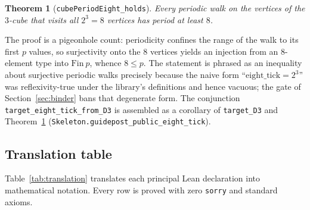 \documentclass[11pt]{article}
\newtheorem{theorem}{Theorem}[section]
\theoremstyle{definition}
\newcommand{\lean}[1]{\texttt{#1}}
\begin{document}
\begin{theorem}[\lean{cubePeriodEight\_holds}]
\label{thm:cube}
Every periodic walk on the vertices of the $3$-cube that visits all $2^3 = 8$ vertices has period at least $8$.
\end{theorem}

The proof is a pigeonhole count: periodicity confines the range of the walk to its first $p$ values, so surjectivity onto the $8$ vertices yields an injection from an $8$-element type into $\mathrm{Fin}\ p$, whence $8 \leq p$. The statement is phrased as an inequality about surjective periodic walks precisely because the naive form ``$\mathrm{eight\_tick} = 2^3$'' was reflexivity-true under the library's definitions and hence vacuous; the gate of Section~\ref{sec:binder} bans that degenerate form. The conjunction \lean{target\_eight\_tick\_from\_D3} is assembled as a corollary of \lean{target\_D3} and Theorem~\ref{thm:cube} (\lean{Skeleton.guidepost\_public\_eight\_tick}).

\subsection{Translation table}

Table~\ref{tab:translation} translates each principal Lean declaration into mathematical notation. Every row is proved with zero \lean{sorry} and standard axioms.
\end{document}
